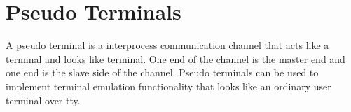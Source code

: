 \chapter{Pseudo Terminals}

A pseudo terminal is a interprocess communication channel that acts like
a terminal and looks like terminal. One end of the channel is the master
end and one end is the slave side of the channel. Pseudo terminals can
be used to implement terminal emulation functionality that looks like an
ordinary user terminal over tty.
